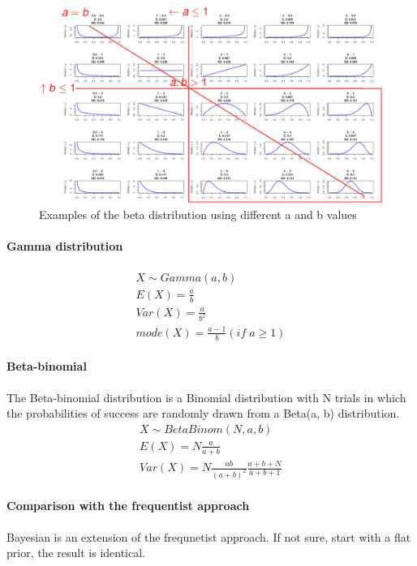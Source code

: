 \begin{figure}[H]
	\centering
	\includegraphics[width=\textwidth]{images/beta-examples.png}
	\caption{Examples of the beta distribution using different a and b values}
\end{figure}

\paragraph{Gamma distribution}
\begin{gather*}
X\sim Gamma(a, b)\\
E(X) = \frac{a}{b}\\
Var(X) = \frac{a}{b^2}\\
mode(X) = \frac{a-1}{b} (if \; a \geq 1)
\end{gather*}

\paragraph{Beta-binomial}
The Beta-binomial distribution is a Binomial distribution with N trials in which the probabilities of success are randomly drawn from a Beta(a, b) distribution.
\begin{gather*}
X\sim BetaBinom(N, a, b)\\
E(X) = N\frac{a}{a+b}\\
Var(X) = N\frac{ab}{(a+b)^2}\frac{a+b+N}{a+b+1}
\end{gather*}

\paragraph{Comparison with the frequentist approach}
Bayesian is an extension of the frequnetist approach. If not sure, start with a flat prior, the result is identical.

